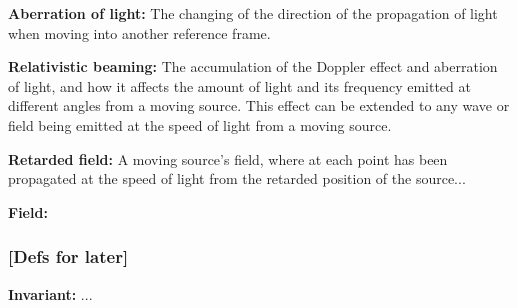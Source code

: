 \noindent \hypertarget{def-aberration}{\textbf{Aberration of light:}}
The changing of the direction of the propagation of light when moving into another reference frame.

\noindent \hypertarget{def-relativistic-beaming}{\textbf{Relativistic beaming:}}
The accumulation of the Doppler effect and aberration of light, and how it affects the amount of light and its frequency emitted at different angles from a moving source. This effect can be extended to any wave or field being emitted at the speed of light from a moving source.

\noindent \hypertarget{def-retarded-field}{\textbf{Retarded field:}}
A moving source's field, where at each point has been propagated at the speed of light from the retarded position of the source...

\noindent \hypertarget{def-field}{\textbf{Field:}}


\subsubsection{[Defs for later]}%

\noindent \hypertarget{def-lorentz-invariant}{\textbf{Invariant:}}
...
